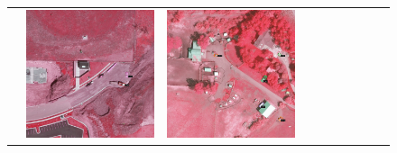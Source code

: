 \begin{figure}[H]
\begin{tabularx}{\textwidth}{c|*{9}{X}}
    & \includegraphics[trim={440pt 360pt 460pt 555pt},clip,width=\linewidth]{images/015Results/02perm_exp/comp_images/irgb/427.png}
    & \includegraphics[trim={740pt 420pt 180pt 510pt},clip,width=\linewidth]{images/015Results/02perm_exp/comp_images/irgb/523.png}

\end{tabularx}
\end{figure}
